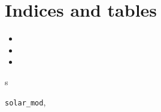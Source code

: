 \documentclass[letterpaper,10pt,english]{sphinxmanual}
\begin{document}
\chapter{Indices and tables}
\label{index:indices-and-tables}\begin{itemize}
\item {} 

\item {} 

\item {} 

\end{itemize}


\renewcommand{\indexname}{Python Module Index}
\begin{theindex}
\def\bigletter#1{{\Large\sffamily#1}\nopagebreak\vspace{1mm}}
\bigletter{s}
\item {\texttt{solar\_mod}}, \pageref{python:module-solar_mod}
\end{theindex}

\renewcommand{\indexname}{Index}
\printindex
\end{document}
